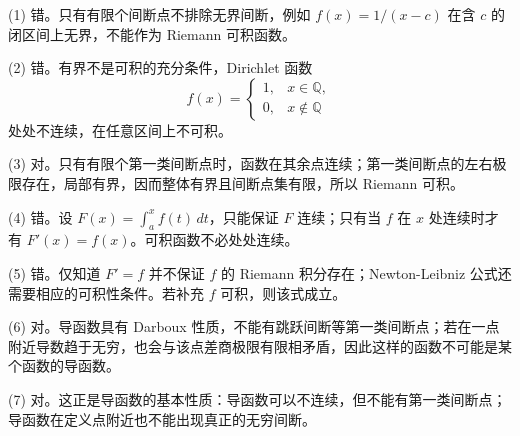 \begin{solutionblock}
(1) 错。只有有限个间断点不排除无界间断，例如 \(f(x)=1/(x-c)\) 在含 \(c\) 的闭区间上无界，不能作为 Riemann 可积函数。

(2) 错。有界不是可积的充分条件，Dirichlet 函数
\[
f(x)=\begin{cases}1,&x\in\mathbb{Q},\\0,&x\notin\mathbb{Q}\end{cases}
\]
处处不连续，在任意区间上不可积。

(3) 对。只有有限个第一类间断点时，函数在其余点连续；第一类间断点的左右极限存在，局部有界，因而整体有界且间断点集有限，所以 Riemann 可积。

(4) 错。设 \(F(x)=\int_a^x f(t)\,dt\)，只能保证 \(F\) 连续；只有当 \(f\) 在 \(x\) 处连续时才有 \(F'(x)=f(x)\)。可积函数不必处处连续。

(5) 错。仅知道 \(F'=f\) 并不保证 \(f\) 的 Riemann 积分存在；Newton-Leibniz 公式还需要相应的可积性条件。若补充 \(f\) 可积，则该式成立。

(6) 对。导函数具有 Darboux 性质，不能有跳跃间断等第一类间断点；若在一点附近导数趋于无穷，也会与该点差商极限有限相矛盾，因此这样的函数不可能是某个函数的导函数。

(7) 对。这正是导函数的基本性质：导函数可以不连续，但不能有第一类间断点；导函数在定义点附近也不能出现真正的无穷间断。
\end{solutionblock}

